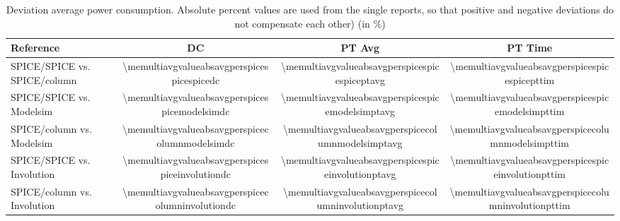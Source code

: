 \documentclass{article}
\begin{document}
\begin{table}[hbt]
\begin{tabular}{ l *{3}{|S[table-column-width=1.44cm]}} 
  {Reference} & {DC} & {PT Avg} & {PT Time} \\
  \hline			
  {SPICE/SPICE vs. SPICE/column} & 
  \num{\memultiavgvalueabsavgperspicespicespicedc} & 
  \num{\memultiavgvalueabsavgperspicespicespiceptavg} & 
  \num{\memultiavgvalueabsavgperspicespicespicepttim} \\
  \hline	
  {SPICE/SPICE vs. Modelsim} & 
  \num{\memultiavgvalueabsavgperspicespicemodelsimdc} & 
  \num{\memultiavgvalueabsavgperspicespicemodelsimptavg} & 
  \num{\memultiavgvalueabsavgperspicespicemodelsimpttim}\\
  {SPICE/column vs. Modelsim} & \num{\memultiavgvalueabsavgperspicecolumnmodelsimdc} & \num{\memultiavgvalueabsavgperspicecolumnmodelsimptavg} & \num{\memultiavgvalueabsavgperspicecolumnmodelsimpttim}\\
  \hline	
  {SPICE/SPICE vs. Involution} & 
  \num{\memultiavgvalueabsavgperspicespiceinvolutiondc} & 
  \num{\memultiavgvalueabsavgperspicespiceinvolutionptavg} & 
  \num{\memultiavgvalueabsavgperspicespiceinvolutionpttim}\\
  {SPICE/column vs. Involution} & \num{\memultiavgvalueabsavgperspicecolumninvolutiondc} & \num{\memultiavgvalueabsavgperspicecolumninvolutionptavg} & \num{\memultiavgvalueabsavgperspicecolumninvolutionpttim}\\
  \hline	
\end{tabular}
\caption{Deviation average power consumption. Absolute percent values are used from the single reports, so that positive and negative deviations do not compensate each other) (in \si{\percent})}
\end{table}
\end{document}
